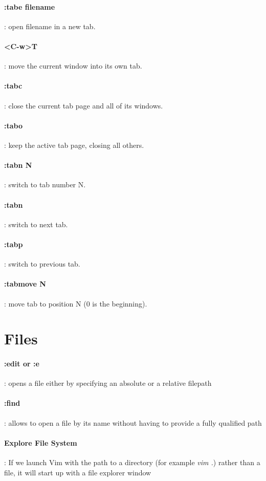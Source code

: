 \documentclass[10pt,letterpaper]{book}
\begin{document}
\paragraph{:tabe {filename}}: open {filename} in a new tab.
\paragraph{<C-w>T}: move the current window into its own tab.
\paragraph{:tabc}: close the current tab page and all of its windows.
\paragraph{:tabo}: keep the active tab page, closing all others.
\paragraph{:tabn N}: switch to tab number N.
\paragraph{:tabn}: switch to next tab.
\paragraph{:tabp}: switch to previous tab.
\paragraph{:tabmove N}: move tab to position N (0 is the beginning).
\section{Files}
\paragraph{:edit or :e}: opens a file either by specifying
an absolute or a relative filepath
\paragraph{:find}: allows to open a file by its name without having to provide a fully qualified path
\paragraph{Explore File System}: If we launch Vim with the path to a directory (for example \textit{vim .}) rather than a file, it will start up with a file explorer window
\end{document}

